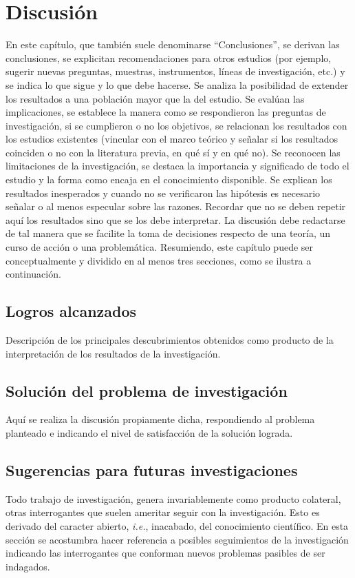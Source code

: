 \fancyhead{}
\fancyfoot{}
\cfoot{\thepage}


\chapter{Discusión}

En este capítulo, que también suele denominarse ``Conclusiones'', se derivan las conclusiones, se explicitan recomendaciones para otros estudios (por ejemplo, sugerir nuevas preguntas, muestras, instrumentos, líneas de investigación, etc.) y se indica lo que sigue y lo que debe hacerse. Se analiza la posibilidad de extender los resultados a una población mayor que la del estudio. Se evalúan las implicaciones, se establece la manera como se respondieron las preguntas de investigación, si se cumplieron o no los objetivos, se relacionan los resultados con los estudios existentes (vincular con el marco teórico y señalar si los resultados coinciden o no con la literatura previa, en qué sí y en qué no). Se reconocen las limitaciones de la investigación, se destaca la importancia y significado de todo el estudio y la forma como encaja en el conocimiento disponible. Se explican los resultados inesperados y cuando no se verificaron las hipótesis es necesario señalar o al menos especular sobre las razones. Recordar que no se deben repetir aquí los resultados sino que se los debe interpretar. La discusión debe redactarse de tal manera que se facilite la toma de decisiones respecto de una teoría, un curso de acción o una problemática. Resumiendo, este capítulo puede ser conceptualmente y dividido en al menos tres secciones, como se ilustra a continuación.

\section{Logros alcanzados}
Descripción de los principales descubrimientos obtenidos como producto de la interpretación de los resultados de la investigación.
\section{Solución del problema de investigación}
Aquí se realiza la discusión propiamente dicha, respondiendo al problema planteado e indicando el nivel de satisfacción de la solución lograda.
\section{Sugerencias para futuras investigaciones}
Todo trabajo de investigación, genera invariablemente como producto colateral, otras interrogantes que suelen ameritar seguir con la investigación. Esto es derivado del caracter abierto, \textit{i.e.}, inacabado, del conocimiento científico. En esta sección se acostumbra hacer referencia a posibles seguimientos de la investigación indicando las interrogantes que conforman nuevos problemas pasibles de ser indagados.   